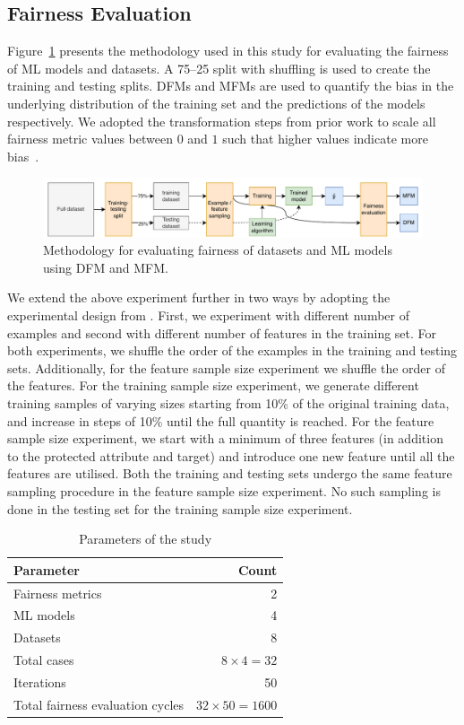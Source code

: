 \documentclass{article}
\begin{document}
\subsection{Fairness Evaluation}\label{sec:method-fair-eval}

Figure \ref{fig:method} presents the methodology used in this study
for evaluating the fairness of ML models and datasets. A 75--25 split
with shuffling is used to create the training and testing splits. DFMs
and MFMs are used to quantify the bias in the underlying distribution
of the training set and the predictions of the models respectively. We
adopted the transformation steps from prior work to scale all fairness
metric values between $0$ and $1$ such that higher values indicate
more bias \cite{zhang2021ignorance,hort2021fairea}.

\begin{figure}
  \centering
  \includegraphics[width=0.95\linewidth]{method.pdf}
  \caption{Methodology for evaluating fairness of datasets and ML
  models using DFM and MFM.}
  \label{fig:method}
\end{figure}

We extend the above experiment further in two ways by adopting the
experimental design from \citeauthor{zhang2021ignorance}. First, we
experiment with different number of examples and second with different
number of features in the training set. For both experiments, we
shuffle the order of the examples in the training and testing
sets. Additionally, for the feature sample size experiment we shuffle
the order of the features. For the training sample size experiment, we
generate different training samples of varying sizes starting from
10\% of the original training data, and increase in steps of 10\%
until the full quantity is reached. For the feature sample size
experiment, we start with a minimum of three features (in addition to
the protected attribute and target) and introduce one new feature
until all the features are utilised. Both the training and testing
sets undergo the same feature sampling procedure in the feature sample
size experiment. No such sampling is done in the testing set for the
training sample size experiment.

\begin{table}
  \centering
  \begin{tabular}{l r}
    \toprule
    \textbf{Parameter} & \textbf{Count}\\
    \midrule
    Fairness metrics & 2\\
    ML models & 4\\
    Datasets & 8\\
    Total cases & $8\times4=32$\\
    Iterations & 50\\
    Total fairness evaluation cycles & $32\times50=1600$\\
    \bottomrule
  \end{tabular}
  \caption{Parameters of the study}
  \label{tab:parameters}
\end{table}
\end{document}
